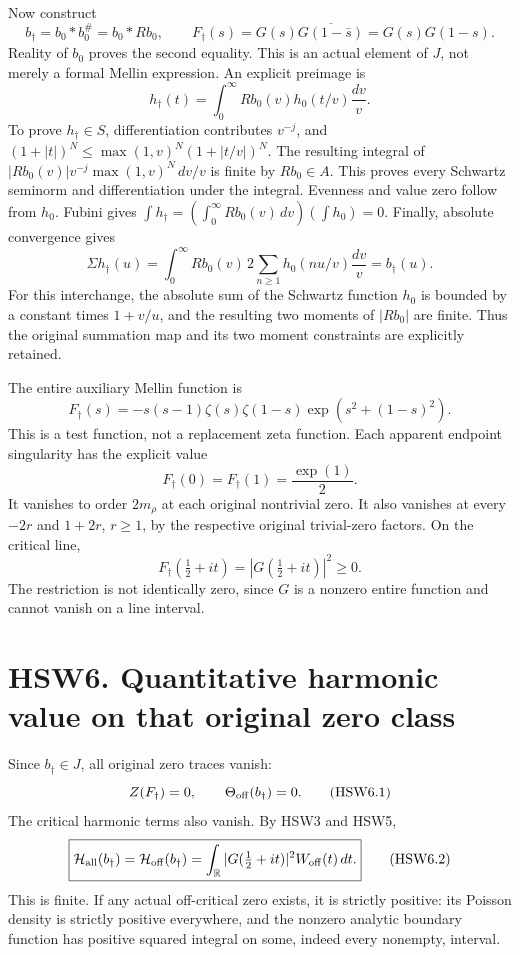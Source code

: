 Now construct \[
b_\dagger=b_0*b_0^\#=b_0*Rb_0,\qquad
F_\dagger(s)=G(s)\overline{G(1-\bar s)}=G(s)G(1-s).
\tag{HSW5.5}
\] Reality of \(b_0\) proves the second equality. This is an actual
element of \(J\), not merely a formal Mellin expression. An explicit
preimage is \[
h_\dagger(t)=\int_0^\infty Rb_0(v)h_0(t/v)\frac{dv}{v}.
\tag{HSW5.6}
\] To prove \(h_\dagger\in S\), differentiation contributes \(v^{-j}\),
and \((1+|t|)^N\le\max(1,v)^N(1+|t/v|)^N\). The resulting integral of
\(|Rb_0(v)|v^{-j}\max(1,v)^N\,dv/v\) is finite by \(Rb_0\in A\). This
proves every Schwartz seminorm and differentiation under the integral.
Evenness and value zero follow from \(h_0\). Fubini gives
\(\int h_\dagger=(\int_0^\infty Rb_0(v)\,dv)(\int h_0)=0\). Finally,
absolute convergence gives \[
\Sigma h_\dagger(u)=
\int_0^\infty Rb_0(v)\,2\sum_{n\ge1}h_0(nu/v)\frac{dv}{v}
=b_\dagger(u).
\tag{HSW5.7}
\] For this interchange, the absolute sum of the Schwartz function
\(h_0\) is bounded by a constant times \(1+v/u\), and the resulting two
moments of \(|Rb_0|\) are finite. Thus the original summation map and
its two moment constraints are explicitly retained.

The entire auxiliary Mellin function is \[
\boxed{F_\dagger(s)=
-s(s-1)\zeta(s)\zeta(1-s)
\exp\!\left(s^2+(1-s)^2\right).}
\tag{HSW5.8}
\] This is a test function, not a replacement zeta function. Each
apparent endpoint singularity has the explicit value \[
F_\dagger(0)=F_\dagger(1)=\frac{\exp(1)}2.
\tag{HSW5.9}
\] It vanishes to order \(2m_\rho\) at each original nontrivial zero. It
also vanishes at every \(-2r\) and \(1+2r\), \(r\ge1\), by the
respective original trivial-zero factors. On the critical line, \[
F_\dagger(\tfrac12+it)=|G(\tfrac12+it)|^2\ge0.
\tag{HSW5.10}
\] The restriction is not identically zero, since \(G\) is a nonzero
entire function and cannot vanish on a line interval.

\section{HSW6. Quantitative harmonic value on that original zero
class}\label{hsw6.-quantitative-harmonic-value-on-that-original-zero-class}

Since \(b_\dagger\in J\), all original zero traces vanish: \[
Z(F_\dagger)=0,\qquad \Theta_{\rm off}(b_\dagger)=0.
\tag{HSW6.1}
\] The critical harmonic terms also vanish. By HSW3 and HSW5, \[
\boxed{\mathcal H_{\rm all}(b_\dagger)
=\mathcal H_{\rm off}(b_\dagger)
=\int_{\mathbb R}|G(\tfrac12+it)|^2W_{\rm off}(t)\,dt.}
\tag{HSW6.2}
\] This is finite. If any actual off-critical zero exists, it is
strictly positive: its Poisson density is strictly positive everywhere,
and the nonzero analytic boundary function has positive squared integral
on some, indeed every nonempty, interval.

